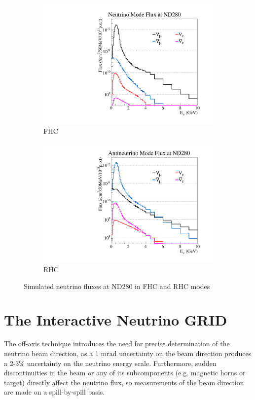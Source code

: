 \begin{figure}[h]
	\begin{subfigure}[t]{0.45\textwidth}
		\includegraphics[width=\textwidth, trim={0mm 0mm 0mm 0mm}, clip,page=1]{figures/det_chap/beam/nd5_alltunedflux_run1-8_zoomed_13a}
		\caption{FHC}
	\end{subfigure}
	\begin{subfigure}[t]{0.45\textwidth}
		\includegraphics[width=\textwidth, trim={0mm 0mm 0mm 0mm}, clip,page=1]{figures/det_chap/beam/nd5_alltunedflux_run5c-7b_zoomed_antinu_13a}
		\caption{RHC}
	\end{subfigure}
	\caption{Simulated neutrino fluxes at ND280 in FHC and RHC modes}
	\label{fig:flux_1to8}
\end{figure}

\section{The Interactive Neutrino GRID}
\label{sec:ingrid}
The off-axis technique introduces the need for precise determination of the neutrino beam direction, as a 1 mrad uncertainty on the beam direction produces a 2-3\% uncertainty on the neutrino energy scale\cite{t2k_det}. Furthermore, sudden discontinuities in the beam or any of its subcomponents (e.g. magnetic horns or target) directly affect the neutrino flux, so measurements of the beam direction are made on a spill-by-spill basis.

